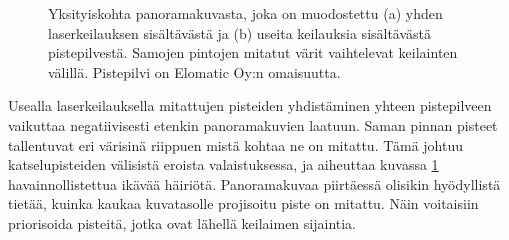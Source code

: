 \begin{figure}[t]
    \centering
    \caption{Yksityiskohta panoramakuvasta, joka on muodostettu (a) yhden laserkeilauksen sisältävästä ja (b) useita keilauksia sisältävästä pistepilvestä. Samojen pintojen mitatut värit vaihtelevat keilainten välillä. Pistepilvi on Elomatic Oy:n omaisuutta.}
    \label{img:kaiuttimet}
\end{figure}

Usealla laserkeilauksella mitattujen pisteiden yhdistäminen yhteen pistepilveen vaikuttaa negatiivisesti etenkin panoramakuvien laatuun. Saman pinnan pisteet tallentuvat eri värisinä riippuen mistä kohtaa ne on mitattu. Tämä johtuu katselupisteiden välisistä eroista valaistuksessa, ja aiheuttaa kuvassa \ref{img:kaiuttimet} havainnollistettua ikävää häiriötä. Panoramakuvaa piirtäessä olisikin hyödyllistä tietää, kuinka kaukaa kuvatasolle projisoitu piste on mitattu. Näin voitaisiin priorisoida pisteitä, jotka ovat lähellä keilaimen sijaintia.

